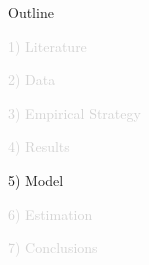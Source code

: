 \documentclass[aspectratio=169]{beamer}
\begin{document}

\begin{frame}[noframenumbering]{Outline}

\Large

\textcolor{lightgray}{1) Literature}

\vspace{4mm}

\textcolor{lightgray}{2) Data}

\vspace{4mm}

\textcolor{lightgray}{3) Empirical Strategy}

\vspace{4mm}

\textcolor{lightgray}{4) Results}

\vspace{4mm}

5) Model

\vspace{4mm}

\textcolor{lightgray}{6) Estimation}

\vspace{4mm}

\textcolor{lightgray}{7) Conclusions}

\end{frame}

\end{document}
